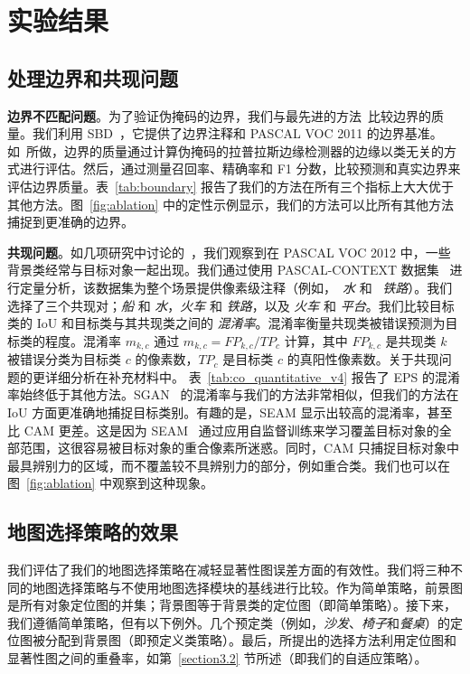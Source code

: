 \documentclass[final]{cvpr}
\begin{document}
\section{实验结果}

\subsection{处理边界和共现问题}\label{section:5.1}

\noindent\textbf{边界不匹配问题}。为了验证伪掩码的边界，我们与最先进的方法~\cite{chen2020boundary, wang2020self, zhou2016learning}比较边界的质量。我们利用 SBD~\cite{hariharan2011semantic}，它提供了边界注释和 PASCAL VOC 2011 的边界基准。如~\cite{chen2020boundary}所做，边界的质量通过计算伪掩码的拉普拉斯边缘检测器的边缘以类无关的方式进行评估。然后，通过测量召回率、精确率和 F1 分数，比较预测和真实边界来评估边界质量。表~\ref{tab:boundary} 报告了我们的方法在所有三个指标上大大优于其他方法。图~\ref{fig:ablation} 中的定性示例显示，我们的方法可以比所有其他方法捕捉到更准确的边界。




\vspace{1mm}
\noindent \textbf{共现问题}。如几项研究中讨论的~\cite{huang2018weakly, kolesnikov2016seed, li2018tell, oh2017exploiting}，我们观察到在 PASCAL VOC 2012 中，一些背景类经常与目标对象一起出现。我们通过使用 PASCAL-CONTEXT 数据集~\cite{mottaghi2014role} 进行定量分析，该数据集为整个场景提供像素级注释（例如，~\emph{水} 和 ~\emph{铁路}）。我们选择了三个共现对；\emph{船} 和 \emph{水}，\emph{火车} 和 \emph{铁路}，以及 \emph{火车} 和 \emph{平台}。我们比较目标类的 IoU 和目标类与其共现类之间的 \emph{混淆率}。混淆率衡量共现类被错误预测为目标类的程度。混淆率 $m_{k,c}$ 通过 $m_{k,c} = FP_{k,c}/TP_{c}$ 计算，其中 ${FP_{k,c}}$ 是共现类 $k$ 被错误分类为目标类 $c$ 的像素数，$TP_{c}$ 是目标类 $c$ 的真阳性像素数。关于共现问题的更详细分析在补充材料中。
表~\ref{tab:co_quantitative_v4} 报告了 EPS 的混淆率始终低于其他方法。SGAN~\cite{yao2020saliency} 的混淆率与我们的方法非常相似，但我们的方法在 IoU 方面更准确地捕捉目标类别。有趣的是，SEAM 显示出较高的混淆率，甚至比 CAM 更差。这是因为 SEAM~\cite{wang2020self} 通过应用自监督训练来学习覆盖目标对象的全部范围，这很容易被目标对象的重合像素所迷惑。同时，CAM 只捕捉目标对象中最具辨别力的区域，而不覆盖较不具辨别力的部分，例如重合类。我们也可以在图~\ref{fig:ablation} 中观察到这种现象。




\subsection{地图选择策略的效果}
我们评估了我们的地图选择策略在减轻显著性图误差方面的有效性。我们将三种不同的地图选择策略与不使用地图选择模块的基线进行比较。作为简单策略，前景图是所有对象定位图的并集；背景图等于背景类的定位图（即简单策略）。接下来，我们遵循简单策略，但有以下例外。几个预定类（例如，\emph{沙发}、\emph{椅子}和\emph{餐桌}）的定位图被分配到背景图（即预定义类策略）。最后，所提出的选择方法利用定位图和显著性图之间的重叠率，如第~\ref{section3.2} 节所述（即我们的自适应策略）。
\end{document}
